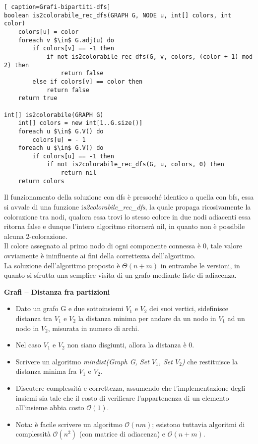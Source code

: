 \documentclass[../cheatSheetAlgoritmi.tex]{subfiles}
\begin{document}
\begin{lstlisting}[ caption=Grafi-bipartiti-dfs]
boolean is2colorabile_rec_dfs(GRAPH G, NODE u, int[] colors, int color)
	colors[u] = color
  	foreach v $\in$ G.adj(u) do
    	if colors[v] == -1 then
      		if not is2colorabile_rec_dfs(G, v, colors, (color + 1) mod 2) then
        		return false
    	else if colors[v] == color then
      		return false
  	return true

int[] is2colorabile(GRAPH G)
 	int[] colors = new int[1..G.size()]
  	foreach u $\in$ G.V() do
    	colors[u] = - 1
  	foreach u $\in$ G.V() do
    	if colors[u] == -1 then 
      		if not is2colorabile_rec_dfs(G, u, colors, 0) then
        		return nil
  	return colors
\end{lstlisting}
Il funzionamento della soluzione con dfs è pressoché identico a quella con bfs, essa si avvale di una funzione i\textit{s2colorabile\_rec\_dfs}, la quale propaga ricosivamente la colorazione tra nodi, qualora essa trovi lo stesso colore in due nodi adiacenti essa ritorna false e dunque l'intero algoritmo ritornerà nil, in quanto non è possibile alcuna 2-colorazione. \\ Il colore assegnato al primo nodo di ogni componente connessa è 0, tale valore ovviamente è ininfluente ai fini della correttezza dell'algoritmo. \\
La soluzione dell'algoritmo proposto è $\Theta(n + m)$ in entrambe le versioni, in quanto si sfrutta una semplice visita di un grafo mediante liste di adiacenza. 

\bigskip
\textbf{Grafi – Distanza fra partizioni}

\begin{itemize}
	\item Dato un grafo G e due sottoinsiemi $V_1$ e $V_2$ dei suoi vertici, sidefinisce distanza tra $V_1$ e $V_2$ la distanza minima per andare da un nodo in $V_1$ ad un nodo in $V_2$, misurata in numero di archi.
	\item Nel caso $V_1$ e $V_2$ non siano disgiunti, allora la distanza è 0.
	\item Scrivere un algoritmo \textit{mindist(Graph G, Set $V_1$, Set $V_2$)} che restituisce la distanza minima fra $V_1$ e $V_2$.
	\item Discutere complessità e correttezza, assumendo che l'implementazione degli insiemi sia tale che il costo di verificare l'appartenenza di un elemento all’insieme abbia costo $\mathcal{O}(1)$.
	\item Nota: è facile scrivere un algoritmo $\mathcal{O}(nm)$; esistono tuttavia algoritmi di complessità $\mathcal{O}(n^2)$ (con matrice di adiacenza) e $\mathcal{O}(n + m)$.
\end{itemize}
\end{document}
